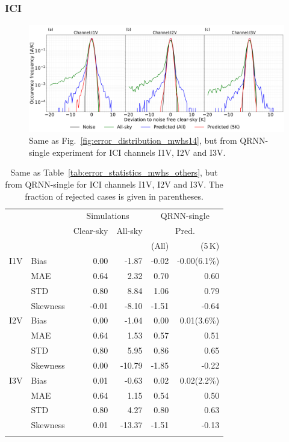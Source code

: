 \documentclass[amt, manuscript]{copernicus}
\begin{document}
\subsubsection{ICI}
%
\begin{figure}[t]
	\includegraphics[width=\textwidth]{Figures/fig08.pdf} 
	\caption{Same as Fig.~\ref{fig:error_distribution_mwhs14}, but from QRNN-single experiment for ICI channels I1V, I2V and I3V. }
	\label{fig:error_distributions}	
\end{figure}
\begin{table}[t]
	\caption{ Same as Table~\ref{tab:error_statistics_mwhs_others}, but from QRNN-single for ICI channels I1V, I2V and I3V. The fraction of rejected cases is given in parentheses.}
	\label{tab:error_statistics_ici}
	\begin{tabular}{llrr|rr}
		\tophline
		&&\multicolumn{2}{c|}{Simulations}& \multicolumn{2}{c}{QRNN-single} \\
		\cline{3-6}
		&&Clear-sky &   All-sky &  \multicolumn{2}{c}{Pred.}  \\
		&&			   &			&	(All) & (5\,K) \\
		\middlehline
		
		I1V&  Bias      &  0.00 & -1.87 & -0.02 & -0.00(6.1\%)  \\
		&MAE       		&  0.64 &  2.32 &  0.70 &  0.60   \\
		&STD       		&  0.80 &  8.84 &  1.06 &  0.79   \\
		&Skewness 		& -0.01 & -8.10 & -1.51 & -0.64  \\
		\middlehline
		I2V & Bias      & 0.00 &  -1.04 &  0.00 &  0.01(3.6\%)  \\
		&MAE       		& 0.64 &   1.53 &  0.57 &  0.51 \\
		&STD       		& 0.80 &   5.95 &  0.86 &  0.65 \\
		&Skewness 		& 0.00 & -10.79 & -1.85 & -0.22  \\
		\middlehline	
		I3V & Bias      & 0.01 &  -0.63 &  0.02 &  0.02(2.2\%)  \\
		&MAE       		& 0.64 &   1.15 &  0.54 &  0.50  \\
		&STD       		& 0.80 &   4.27 &  0.80 &  0.63  \\
		&Skewness 		& 0.01 & -13.37 & -1.51 & -0.13  \\
		\bottomhline
	\end{tabular}
	\belowtable{} %
\end{table}
\end{document}
